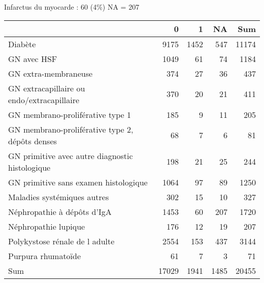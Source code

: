 \documentclass[11pt,a4paper]{article}\usepackage[]{graphicx}\usepackage[]{color}
\begin{document}
Infarctus du myocarde : 60 (4\%) NA = 207

\begin{table}[H]
\centering
\begin{tabular}{lrrrr}
  \hline
 & 0 & 1 & NA & Sum \\ 
  \hline
Diabète & 9175 & 1452 & 547 & 11174 \\ 
  GN avec HSF & 1049 & 61 & 74 & 1184 \\ 
  GN extra-membraneuse & 374 & 27 & 36 & 437 \\ 
  GN extracapillaire ou endo/extracapillaire & 370 & 20 & 21 & 411 \\ 
  GN membrano-proliférative type 1 & 185 & 9 & 11 & 205 \\ 
  GN membrano-proliférative type 2, dépôts denses & 68 & 7 & 6 & 81 \\ 
  GN primitive avec autre diagnostic histologique & 198 & 21 & 25 & 244 \\ 
  GN primitive sans examen histologique & 1064 & 97 & 89 & 1250 \\ 
  Maladies systémiques autres & 302 & 15 & 10 & 327 \\ 
  Néphropathie à dépôts d'IgA & 1453 & 60 & 207 & 1720 \\ 
  Néphropathie lupique & 176 & 12 & 19 & 207 \\ 
  Polykystose rénale de l adulte & 2554 & 153 & 437 & 3144 \\ 
  Purpura rhumatoïde & 61 & 7 & 3 & 71 \\ 
  Sum & 17029 & 1941 & 1485 & 20455 \\ 
   \hline
\end{tabular}
\end{table}
\end{document}
